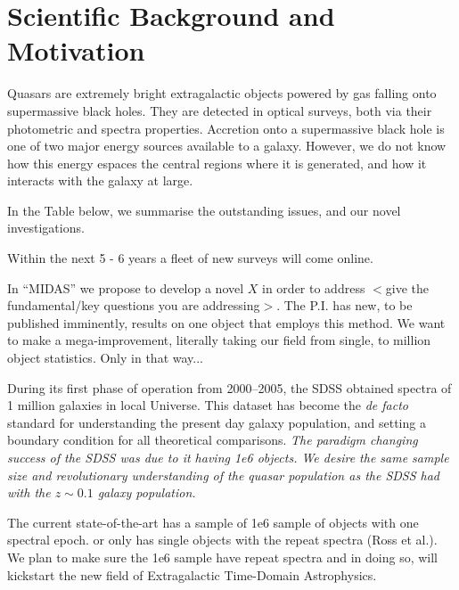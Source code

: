 \documentclass[oneside, a4paper, onecolumn, 11pt]{article}
\begin{document}
\smallskip
\smallskip
\noindent
\section{\textcolor{Cerulean}{Scientific Background and Motivation}}
Quasars are extremely bright extragalactic objects powered by gas falling onto supermassive black holes. 
They are detected in optical surveys, both via their photometric and spectra properties. 
Accretion onto a supermassive black hole is one of two major energy sources available to a galaxy. 
However, we do not know how this energy espaces the central regions where it is generated, and 
how it interacts with the galaxy at large. 

\smallskip
\smallskip
\noindent
In the Table below, we summarise the outstanding issues, and our novel investigations. 

\smallskip
\smallskip


\smallskip
\smallskip
\noindent
Within the next 5 - 6 years a fleet of new surveys will come online. 

\smallskip
\smallskip
\noindent
In ``MIDAS'' we propose to develop a novel $X$ in order to address 
$<$give the fundamental/key questions you are addressing$>$. 
The P.I. has new, to be published imminently, results on one object that employs this method. 
We want to make a mega-improvement, literally taking our field from single, to million object 
statistics. Only in that way... 

\smallskip
\smallskip
\noindent
During its first phase of operation from 2000–2005, the SDSS obtained spectra 
of 1 million galaxies in local Universe. This dataset has become the {\it de facto} standard 
for understanding the present day galaxy population, and setting a boundary 
condition for all theoretical comparisons. 
{\it The paradigm changing success of the SDSS was due to it having 1e6 objects. 
We desire the same sample size and revolutionary understanding of the quasar 
population as the SDSS had with the $z\sim0.1$ galaxy population.}

\smallskip
\smallskip
\noindent
The current state-of-the-art has a sample of 1e6 sample of objects with one spectral epoch. 
or only has single objects with the repeat spectra (Ross et al.).
We plan to make sure the  1e6 sample have repeat spectra and in doing so, will 
kickstart the new field of Extragalactic Time-Domain Astrophysics.
\end{document}
